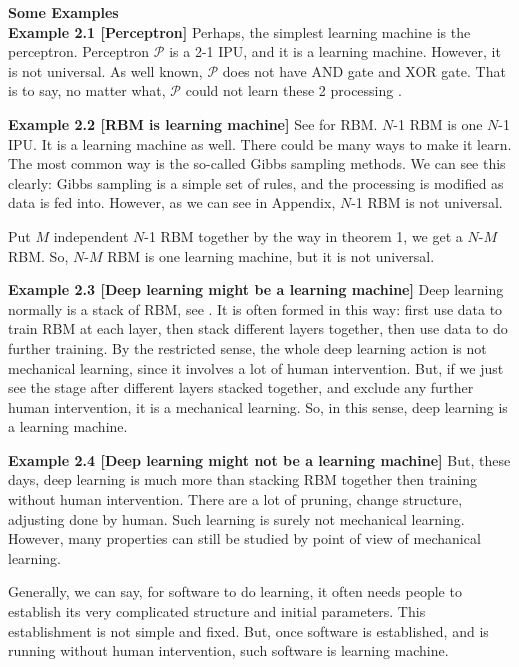 {\bf Some Examples}\\
{\bf Example 2.1 [\bf Perceptron]}
Perhaps, the simplest learning machine is the perceptron. Perceptron $\mathcal{P}$ is a 2-1 IPU, and it is a learning machine. However, it is not universal. As well known, $\mathcal{P}$ does not have AND gate and XOR gate. That is to say, no matter what, $\mathcal{P}$ could not learn these 2 processing . 
\medskip

{\bf Example 2.2 [\bf RBM is learning machine]} 
See \cite{hinton} for RBM. $N$-1 RBM is one $N$-1 IPU. It is a learning machine as well. There could be many ways to make it learn. The most common way is the so-called Gibbs sampling methods. We can see this clearly: Gibbs sampling is a simple set of rules, and the processing is modified as data is fed into. However, as we can see in Appendix, $N$-1 RBM is not universal.

Put $M$ independent $N$-1 RBM together by the way in theorem 1, we get a $N$-$M$ RBM. So, $N$-$M$ RBM is one learning machine, but it is not universal. 
\medskip

{\bf Example 2.3 [\bf Deep learning might be a learning machine]}
Deep learning normally is a stack of RBM, see \cite{hinton}. It is often formed in this way: first use data to train RBM at each layer, then stack different layers together, then use data to do further training. By the restricted sense, the whole deep learning action is not mechanical learning, since it involves a lot of human intervention. But, if we just see the stage after different layers stacked together, and exclude any further human intervention, it is a mechanical learning. So, in this sense, deep learning is a learning machine.
\medskip

{\bf Example 2.4 [\bf Deep learning might not be a learning machine]}
But, these days, deep learning is much more than stacking RBM together then training without human intervention. There are a lot of pruning, change structure, adjusting done by human. Such learning is surely not mechanical learning. However, many properties can still be studied by point of view of mechanical learning. 
\medskip

Generally, we can say, for software to do learning, it often needs people to establish its very complicated structure and initial parameters. This establishment is not simple and fixed. But, once software is established, and is running without human intervention, such software is learning machine.

